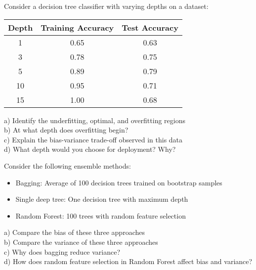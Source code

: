 \documentclass{article}
\newcounter{exercise}
\begin{document}
\begin{tcolorbox}[colback=gray!5!white,colframe=gray!75!black,title=Problem \stepcounter{exercise}: Decision Tree Depth Analysis]

Consider a decision tree classifier with varying depths on a dataset:

\begin{center}
\begin{tabular}{|c|c|c|}
\hline
Depth & Training Accuracy & Test Accuracy \\
\hline
1 & 0.65 & 0.63 \\
3 & 0.78 & 0.75 \\
5 & 0.89 & 0.79 \\
10 & 0.95 & 0.71 \\
15 & 1.00 & 0.68 \\
\hline
\end{tabular}
\end{center}

a) Identify the underfitting, optimal, and overfitting regions\\
b) At what depth does overfitting begin?\\
c) Explain the bias-variance trade-off observed in this data\\
d) What depth would you choose for deployment? Why?
\end{tcolorbox}

\begin{tcolorbox}[colback=gray!5!white,colframe=gray!75!black,title=Problem \stepcounter{exercise}: Ensemble Methods and Bias-Variance]

Consider the following ensemble methods:
\begin{itemize}
    \item Bagging: Average of 100 decision trees trained on bootstrap samples
    \item Single deep tree: One decision tree with maximum depth
    \item Random Forest: 100 trees with random feature selection
\end{itemize}

a) Compare the bias of these three approaches\\
b) Compare the variance of these three approaches\\
c) Why does bagging reduce variance?\\
d) How does random feature selection in Random Forest affect bias and variance?
\end{tcolorbox}
\end{document}

